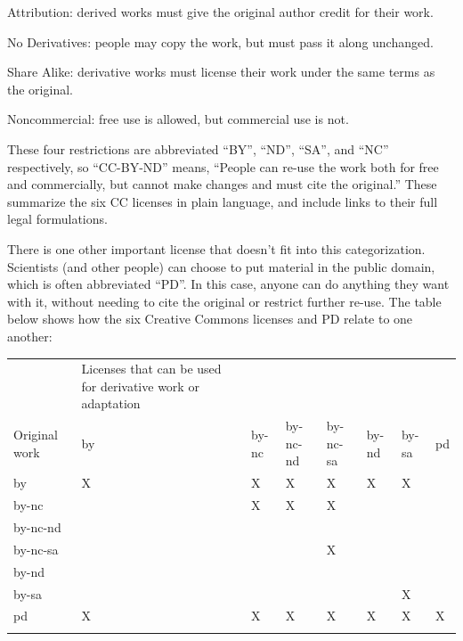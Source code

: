 \documentclass{book}
\begin{document}
\begin{swcitemize}
\item
  Attribution: derived works must give the original author credit for
  their work.
\item
  No Derivatives: people may copy the work, but must pass it along
  unchanged.
\item
  Share Alike: derivative works must license their work under the same
  terms as the original.
\item
  Noncommercial: free use is allowed, but commercial use is not.
\end{swcitemize}

These four restrictions are abbreviated ``BY'', ``ND'', ``SA'', and
``NC'' respectively, so ``CC-BY-ND'' means, ``People can re-use the work
both for free and commercially, but cannot make changes and must cite
the original.'' These  summarize the six CC licenses in plain language, and
include links to their full legal formulations.

There is one other important license that doesn't fit into this
categorization. Scientists (and other people) can choose to put material
in the public domain, which is often abbreviated ``PD''. In this case,
anyone can do anything they want with it, without needing to cite the
original or restrict further re-use. The table below shows how the six
Creative Commons licenses and PD relate to one another:

\begin{tabular}{llllllll}
\hline\noalign{\medskip}
& Licenses that can be used for derivative work or adaptation
\\\noalign{\medskip}
Original work & by & by-nc & by-nc-nd & by-nc-sa & by-nd & by-sa & pd
\\\noalign{\medskip}
by & X & X & X & X & X & X &
\\\noalign{\medskip}
by-nc & & X & X & X & & &
\\\noalign{\medskip}
by-nc-nd & & & & & & &
\\\noalign{\medskip}
by-nc-sa & & & & X & & &
\\\noalign{\medskip}
by-nd & & & & & & &
\\\noalign{\medskip}
by-sa & & & & & & X &
\\\noalign{\medskip}
pd & X & X & X & X & X & X & X
\\\noalign{\medskip}
\hline
\end{tabular}
\end{document}
